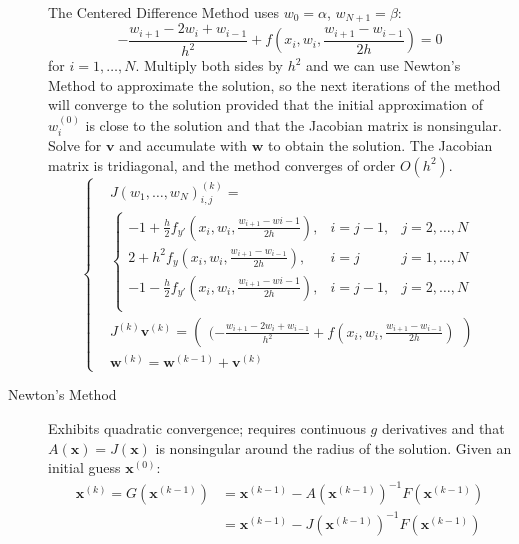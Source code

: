 \documentclass[8pt]{article}
\begin{document}
\begin{multicols}{2}
\begin{description}
\begin{itemize}
    \end{itemize}
    The Centered Difference Method uses $w_0 = \alpha$, $w_{N+1} =
    \beta$:
    $$-\frac{w_{i+1}-2w_i+w_{i-1}}{h^2} +
    f\left(x_i,w_i,\frac{w_{i+1}-w_{i-1}}{2h}\right) = 0$$ 
    for $i=1,\ldots,N$.  Multiply both sides by $h^2$ and we can use
    Newton's Method to approximate the solution, so the next
    iterations of the method will converge to the solution provided
    that the initial approximation of $w_i^{(0)}$ is close to the
    solution and that the Jacobian matrix is nonsingular. Solve for
    $\mathbf{v}$ and accumulate with $\mathbf{w}$ to obtain the
    solution. The Jacobian matrix is tridiagonal, and the method
    converges of order $O(h^2)$.
    \begin{equation*}
      \left\{
        \begin{aligned}
          &J(w_1,\ldots,w_N)_{i,j}^{(k)}= \\
          & \left\{
            \begin{array}{ccc}
              -1+\frac{h}{2}f_{y'}\left(x_i,w_i,\frac{w_{i+1}-w{i-1}}{2h}\right), & i=j-1, & j=2,\ldots,N \\
              2+h^2f_y\left(x_i,w_i,\frac{w_{i+1}-w_{i-1}}{2h}\right), & i=j & j=1,\ldots,N \\
              -1-\frac{h}{2}f_{y'}\left(x_i,w_i,\frac{w_{i+1}-w{i-1}}{2h}\right), & i=j-1, & j=2,\ldots,N \\
            \end{array}
          \right.\\
          &J^{(k)}\mathbf{v}^{(k)} = \begin{pmatrix} (-\frac{w_{i+1}-2w_i+w_{i-1}}{h^2} +
            f\left(x_i,w_i,\frac{w_{i+1}-w_{i-1}}{2h}\right) \end{pmatrix}\\
          &\mathbf{w}^{(k)} = \mathbf{w}^{(k-1)} + \mathbf{v}^{(k)}
        \end{aligned}
      \right.
    \end{equation*}
  \item[Newton's Method] Exhibits quadratic convergence; requires
    continuous $g$ derivatives and that $A(\mathbf{x}) =
    J(\mathbf{x})$ is nonsingular around the radius of the
    solution.  Given an initial guess $\mathbf{x}^{(0)}$:
    \begin{align*}
      \mathbf{x}^{(k)}=G(\mathbf{x}^{(k-1)})&=\mathbf{x}^{(k-1)}-A(\mathbf{x}^{(k-1)})^{-1}F(\mathbf{x}^{(k-1)}) \\
      &=\mathbf{x}^{(k-1)}-J(\mathbf{x}^{(k-1)})^{-1}F(\mathbf{x}^{(k-1)}) \\

\end{align*}
\end{description}
\end{multicols}
\end{document}

